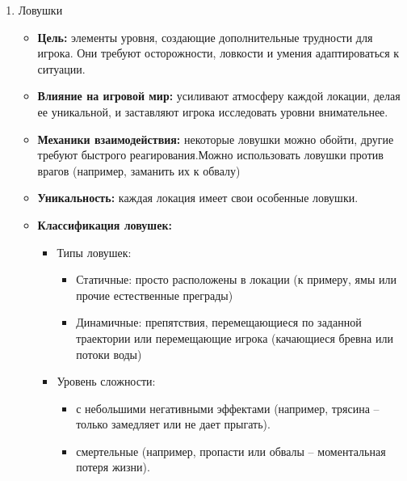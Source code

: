 \documentclass{article}
\begin{document}
\begin{enumerate}
    \item Ловушки
    \begin{itemize}
     \item \textbf{Цель:} элементы уровня, создающие дополнительные трудности для игрока. Они требуют осторожности, ловкости и умения адаптироваться к ситуации.
     \item \textbf{Влияние на игровой мир:} усиливают атмосферу каждой локации, делая ее уникальной, и заставляют игрока исследовать уровни внимательнее.
     \item \textbf{Механики взаимодействия:} некоторые ловушки можно обойти, другие требуют быстрого реагирования.Можно использовать ловушки против врагов (например, заманить их к обвалу)
     \item \textbf{Уникальность:} каждая локация имеет свои особенные ловушки.
     \item \textbf{Классификация ловушек:}
     \begin{itemize}
            \item Типы ловушек:
                \begin{itemize}
                    \item Статичные: просто расположены в локации (к примеру, ямы или прочие естественные преграды)
                    \item Динамичные: препятствия, перемещающиеся по заданной траектории или перемещающие игрока (качающиеся бревна или потоки воды)
                \end{itemize}
            \item Уровень сложности:
                \begin{itemize}
                    \item с небольшими негативными эффектами (например, трясина – только замедляет или не дает прыгать).
                    \item смертельные (например, пропасти или обвалы – моментальная потеря жизни).
                \end{itemize}
     \end {itemize}
     \end{itemize}


\end{enumerate}
\end{document}
